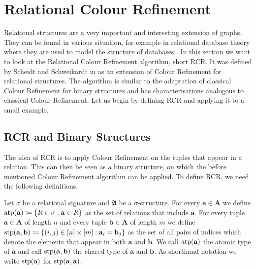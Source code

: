 \section{Relational Colour Refinement}
\label{sec:RelationalColourRefinement}

Relational structures are a very important and interesting extension of graphs.
They can be found in various situation, for example in relational database theory where they are used to model the structure of databases \cite{abiteboul1996FoundationsDatabases}.
In this section we want to look at the Relational Colour Refinement algorithm, short RCR. 
It was defined by Scheidt and Schweikardt in \cite{scheidt2025ColorRefinement} as an extension of Colour Refinement for relational structures.
The algorithm is similar to the adaptation of classical Colour Refinement for binary structures and has characterisations analogous to classical Colour Refinement.
Let us begin by defining RCR and applying it to a small example.

\subsection{RCR and Binary Structures}

The idea of RCR is to apply Colour Refinement on the tuples that appear in a relation.
This can then be seen as a binary structure, on which the before mentioned Colour Refinement algorithm can be applied.
To define RCR, we need the following definitions.

\begin{definition}
	Let $\sigma$ be a relational signature and $\mathfrak A$ be a $\sigma$-structure.
	For every $\mathbf a \in \mathbf A$ we define $\operatorname{atp}(\mathbf a)\coloneqq \{R \in \sigma : \mathbf a\in R\}$ as the set of relations that include $\mathbf a$.
	For every tuple $\mathbf a\in \mathbf A$ of length $n$ and every tuple $\mathbf b\in \mathbf A$ of length $m$ we define $\operatorname{stp}(\mathbf a, \mathbf b)\coloneqq\{(i, j) \in [n]\times [m] : \mathbf a_i=\mathbf b_j\}$ as the set of all pairs of indices which denote the elements that appear in both $\mathbf a$ and $\mathbf b$.
	We call $\operatorname{atp}(\mathbf a)$ the atomic type of $\mathbf a$ and call $\operatorname{stp}(\mathbf a,\mathbf b)$ the shared type of $\mathbf a$ and $\mathbf b$.
	As shorthand notation we write $\operatorname{stp}(\mathbf a)$ for $\operatorname{stp}(\mathbf a, \mathbf a)$.
\end{definition}

